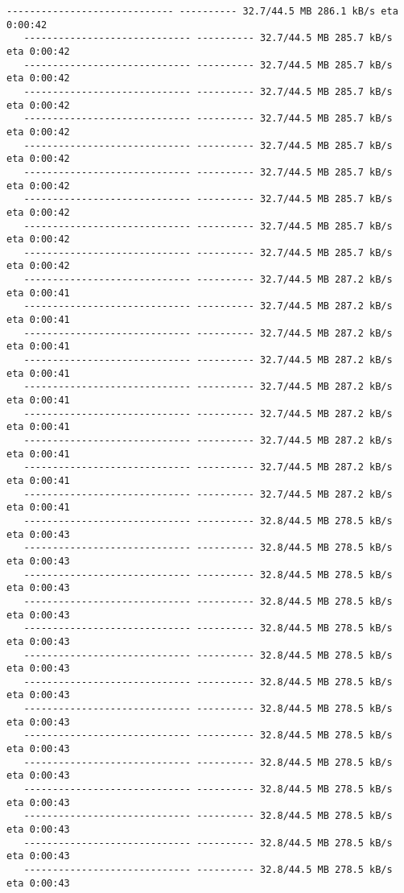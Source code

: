 \documentclass[11pt]{article}
\begin{document}
\begin{Verbatim}[commandchars=\\\{\}]
   ----------------------------- ---------- 32.7/44.5 MB 286.1 kB/s eta 0:00:42
   ----------------------------- ---------- 32.7/44.5 MB 285.7 kB/s eta 0:00:42
   ----------------------------- ---------- 32.7/44.5 MB 285.7 kB/s eta 0:00:42
   ----------------------------- ---------- 32.7/44.5 MB 285.7 kB/s eta 0:00:42
   ----------------------------- ---------- 32.7/44.5 MB 285.7 kB/s eta 0:00:42
   ----------------------------- ---------- 32.7/44.5 MB 285.7 kB/s eta 0:00:42
   ----------------------------- ---------- 32.7/44.5 MB 285.7 kB/s eta 0:00:42
   ----------------------------- ---------- 32.7/44.5 MB 285.7 kB/s eta 0:00:42
   ----------------------------- ---------- 32.7/44.5 MB 285.7 kB/s eta 0:00:42
   ----------------------------- ---------- 32.7/44.5 MB 285.7 kB/s eta 0:00:42
   ----------------------------- ---------- 32.7/44.5 MB 287.2 kB/s eta 0:00:41
   ----------------------------- ---------- 32.7/44.5 MB 287.2 kB/s eta 0:00:41
   ----------------------------- ---------- 32.7/44.5 MB 287.2 kB/s eta 0:00:41
   ----------------------------- ---------- 32.7/44.5 MB 287.2 kB/s eta 0:00:41
   ----------------------------- ---------- 32.7/44.5 MB 287.2 kB/s eta 0:00:41
   ----------------------------- ---------- 32.7/44.5 MB 287.2 kB/s eta 0:00:41
   ----------------------------- ---------- 32.7/44.5 MB 287.2 kB/s eta 0:00:41
   ----------------------------- ---------- 32.7/44.5 MB 287.2 kB/s eta 0:00:41
   ----------------------------- ---------- 32.7/44.5 MB 287.2 kB/s eta 0:00:41
   ----------------------------- ---------- 32.8/44.5 MB 278.5 kB/s eta 0:00:43
   ----------------------------- ---------- 32.8/44.5 MB 278.5 kB/s eta 0:00:43
   ----------------------------- ---------- 32.8/44.5 MB 278.5 kB/s eta 0:00:43
   ----------------------------- ---------- 32.8/44.5 MB 278.5 kB/s eta 0:00:43
   ----------------------------- ---------- 32.8/44.5 MB 278.5 kB/s eta 0:00:43
   ----------------------------- ---------- 32.8/44.5 MB 278.5 kB/s eta 0:00:43
   ----------------------------- ---------- 32.8/44.5 MB 278.5 kB/s eta 0:00:43
   ----------------------------- ---------- 32.8/44.5 MB 278.5 kB/s eta 0:00:43
   ----------------------------- ---------- 32.8/44.5 MB 278.5 kB/s eta 0:00:43
   ----------------------------- ---------- 32.8/44.5 MB 278.5 kB/s eta 0:00:43
   ----------------------------- ---------- 32.8/44.5 MB 278.5 kB/s eta 0:00:43
   ----------------------------- ---------- 32.8/44.5 MB 278.5 kB/s eta 0:00:43
   ----------------------------- ---------- 32.8/44.5 MB 278.5 kB/s eta 0:00:43
   ----------------------------- ---------- 32.8/44.5 MB 278.5 kB/s eta 0:00:43

\end{Verbatim}
\end{document}
